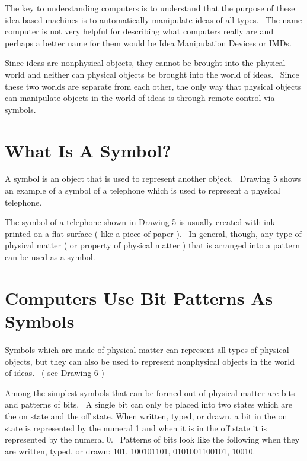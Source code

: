 \documentclass[12pt,twoside]{book}
\begin{document}
\bigskip

The key to understanding computers is to understand that the purpose of
these idea{}-based machines is to automatically manipulate ideas of all
types. \ The name {\textquotesingle}computer{\textquotesingle} is not
very helpful for describing what computers really are and perhaps a
better name for them would be Idea Manipulation Devices or IMDs.


\bigskip

Since ideas are nonphysical objects, they cannot be brought into the
physical world and neither can physical objects be brought into the
world of ideas. \ Since these two worlds are separate from each other,
the only way that physical objects can manipulate objects in the world
of ideas is through remote control via symbols.

\section[What Is A Symbol?]{What Is A Symbol?}

A symbol is an object that is used to represent another object.
\ Drawing 5 shows an example of a symbol of a telephone which is used
to represent a physical telephone.


\bigskip

The symbol of a telephone shown in Drawing 5 is usually created with ink
printed on a flat surface ( like a piece of paper ). \ In general,
though, any type of physical matter ( or property of physical matter )
that is arranged into a pattern can be used as a symbol.

\section[Computers Use Bit Patterns As Symbols]{
Computers Use Bit Patterns As Symbols}

Symbols which are made of physical matter can represent all types of
physical objects, but they can also be used to represent nonphysical
objects in the world of ideas. \ ( see Drawing 6 )


\bigskip


\bigskip

Among the simplest symbols that can be formed out of physical matter are
bits and patterns of bits. \ A single bit can only be placed into two
states which are the on state and the off state. When written, typed,
or drawn, a bit in the on state is represented by the numeral 1 and
when it is in the off state it is represented by the numeral 0.
\ Patterns of bits look like the following when they are written,
typed, or drawn: 101, 100101101, 0101001100101, 10010.
\end{document}
